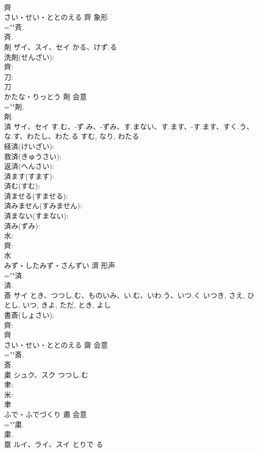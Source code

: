 \documentclass[8pt]{extreport}
\begin{document}
\begin{CJK}{UTF8}{min}
\\	齊	
\\	さい・せい・ととのえる	齊	象形 
\\	=""斉.
\\	斉.
\\	剤	ザイ、スイ、セイ	かる、けず.る		
\\	洗剤(せんざい): 
\\	齊: 
\\	刀: 
\\	刀	
\\	かたな・りっとう	劑	会意 
\\	=""剤.
\\	剤.
\\	済	サイ、セイ	す.む、-ず.み、-ずみ、す.まない、す.ます、-す.ます、すく.う、な.す、わたし、わた.る	すむ, なり, わたる	
\\	経済(けいざい): 
\\	救済(きゅうさい): 
\\	返済(へんさい): 
\\	済ます(すます): 
\\	済む(すむ): 
\\	済ませる(すませる): 
\\	済みません(すみません): 
\\	済まない(すまない): 
\\	済み(ずみ): 
\\	水: 
\\	齊: 
\\	水	
\\	みず・したみず・さんずい	濟	形声 
\\	=""済.
\\	済.
\\	斎	サイ	とき、つつし.む、ものいみ、い.む、いわ.う、いつ.く	いつき, さえ, ひとし, いつ, きよ, ただ, とき, よし	
\\	書斎(しょさい): 
\\	齊: 
\\	齊	
\\	さい・せい・ととのえる	齋	会意 
\\	=""斎.
\\	斎.
\\	粛	シュク、スク	つつし.む		
\\	聿: 
\\	米: 
\\	聿	
\\	ふで・ふでづくり	肅	会意 
\\	=""粛.
\\	粛.
\\	塁	ルイ、ライ、スイ	とりで	る	

\end{CJK}
\end{document}
